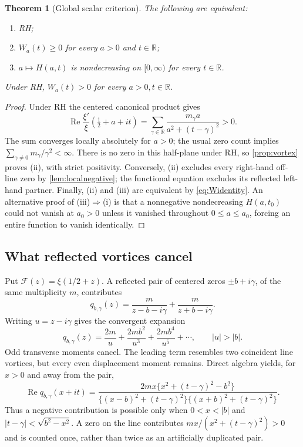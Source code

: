 \documentclass[11pt,letterpaper]{article}
\numberwithin{equation}{section}
\newtheorem{theorem}{Theorem}[section]
\theoremstyle{definition}
\theoremstyle{remark}
\newcommand{\R}{\mathbb R}
\newcommand{\Repart}{\operatorname{Re}}
\begin{document}
\begin{theorem}[Global scalar criterion]\label{thm:scalar}
The following are equivalent:
\begin{enumerate}[label=(\roman*)]
\item RH;
\item $W_a(t)\ge0$ for every $a>0$ and $t\in\R$;
\item $a\mapsto H(a,t)$ is nondecreasing on $[0,\infty)$ for every $t\in\R$.
\end{enumerate}
Under RH, $W_a(t)>0$ for every $a>0,t\in\R$.
\end{theorem}
\begin{proof}
Under RH the centered canonical product gives
\begin{equation}\label{eq:Poisson}
\Repart\frac{\xi'}{\xi}(\tfrac12+a+it)
=\sum_{\gamma\in\R}\frac{m_\gamma a}{a^2+(t-\gamma)^2}>0.
\end{equation}
The sum converges locally absolutely for $a>0$; the usual zero count implies $\sum_{\gamma\ne0}m_\gamma/\gamma^2<\infty$. There is no zero in this half-plane under RH, so \cref{prop:vortex} proves (ii), with strict positivity. Conversely, (ii) excludes every right-hand off-line zero by \cref{lem:localnegative}; the functional equation excludes its reflected left-hand partner. Finally, (ii) and (iii) are equivalent by \eqref{eq:Widentity}. An alternative proof of (iii)$\Rightarrow$(i) is that a nonnegative nondecreasing $H(a,t_0)$ could not vanish at $a_0>0$ unless it vanished throughout $0\le a\le a_0$, forcing an entire function to vanish identically.
\end{proof}

\subsection{What reflected vortices cancel}
Put $\mathcal F(z)=\xi(1/2+z)$. A reflected pair of centered zeros $\pm b+i\gamma$, of the same multiplicity $m$, contributes
\begin{equation}\label{eq:pairfield}
q_{b,\gamma}(z)=\frac{m}{z-b-i\gamma}+\frac{m}{z+b-i\gamma}.
\end{equation}
Writing $u=z-i\gamma$ gives the convergent expansion
\begin{equation}\label{eq:multipole}
q_{b,\gamma}(z)=\frac{2m}{u}+\frac{2mb^2}{u^3}+\frac{2mb^4}{u^5}+\cdots,
\qquad |u|>|b|.
\end{equation}
Odd transverse moments cancel. The leading term resembles two coincident line vortices, but every even displacement moment remains. Direct algebra yields, for $x>0$ and away from the pair,
\begin{equation}\label{eq:pairSign}
\Repart q_{b,\gamma}(x+it)=
\frac{2mx\{x^2+(t-\gamma)^2-b^2\}}
{\{(x-b)^2+(t-\gamma)^2\}\{(x+b)^2+(t-\gamma)^2\}}.
\end{equation}
Thus a negative contribution is possible only when $0<x<|b|$ and $|t-\gamma|<\sqrt{b^2-x^2}$. A zero on the line contributes $mx/(x^2+(t-\gamma)^2)>0$ and is counted once, rather than twice as an artificially duplicated pair.
\end{document}
